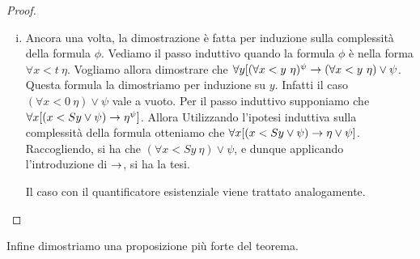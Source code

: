 \documentclass[]{marticle}
\begin{document}
\begin{proof}
\begin{enumerate}[(i)]
            Nel caso in cui l'ultimo passo della dimostrazione di $\Gamma \vdash
            \phi \sub{\l \overline{x}. \eta}{X}$ fosse fatto eliminando il
            quantificatore del secondo ordine a partire da $\Gamma \vdash
            \forall X \phi$, allora per ipotesi induttiva si ha che $\Gamma^\psi
            \vdash (\forall X \phi)^\psi = \forall X \phi^\psi$. Ma allora
            $\Gamma^\psi \vdash \phi\sub{\l \overline{x}. \eta^\psi}{X}$. Per il
            terzo punto si ottiene il risultato voluto $\Gamma ^\psi \vdash
            (\phi\sub{\l \overline{x}.\eta}{X})^\psi$.

            Nel caso in cui la dimostrazione di $\Gamma \vdash
            \phi\sub{\overline{t}} {\overline{x}}$ si concludesse con
            l'eliminazione del quantificatore universale del primo ordine a
            partire dal giudizio $\Gamma \vdash \forall x\phi$, si avrebbe che
            per ipotesi induttiva $\Gamma ^\psi \vdash \forall x \phi^\psi$.
            Dunque $\Gamma ^\psi \vdash
            \phi^\psi\sub{\overline{t}}{\overline{x}}$ e la tesi si ottiene
            applicando il secondo punto.
        \item Ancora una volta, la dimostrazione \`e fatta per induzione sulla
            complessit\`a della formula $\phi$. Vediamo il passo induttivo
            quando la formula $\phi$ \`e nella forma $\forall x<t\ \eta$.
            Vogliamo allora dimostrare che $\forall y [(\forall x<y\ \eta) ^\psi
            \rightarrow (\forall x<y\ \eta) \lor \psi$. Questa formula la dimostriamo
            per induzione su $y$. Infatti il caso $(\forall x<0\ \eta)\lor \psi$
            vale a vuoto. Per il passo induttivo supponiamo che $\forall x
            [(x<Sy \lor \psi) \rightarrow \eta^\psi]$. Allora Utilizzando l'ipotesi
            induttiva sulla complessit\`a della formula otteniamo che $\forall x
            [(x<Sy \lor \psi) \rightarrow \eta \lor \psi]$. Raccogliendo, si ha che
            $(\forall x<Sy\ \eta)\lor \psi$, e dunque applicando l'introduzione
            di $\rightarrow$, si ha la tesi.
            
            Il caso con il quantificatore esistenziale viene trattato
            analogamente.
    \end{enumerate}
\end{proof}

Infine dimostriamo una proposizione pi\`u forte del teorema.
\end{document}
